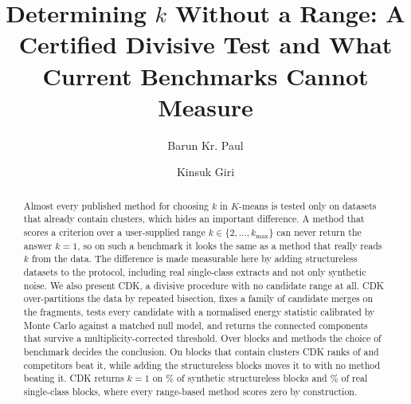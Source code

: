 \documentclass[runningheads]{llncs}
\newif\ifanon
\begin{document}
\title{Determining $k$ Without a Range: A Certified Divisive Test and What
Current Benchmarks Cannot Measure}


\ifanon
  \author{Anonymous Author(s)}
  \authorrunning{Anonymous}
  \institute{Affiliation withheld for double-blind review}
\else
  \author{Barun Kr. Paul \and Kinsuk Giri}
\fi

\maketitle

\begin{abstract}
Almost every published method for choosing $k$ in $K$-means is tested only on
datasets that already contain clusters, which hides an important difference. A
method that scores a criterion over a user-supplied range
$k \in \{2,\dots,k_{\max}\}$ can never return the answer $k=1$, so on such a
benchmark it looks the same as a method that really reads $k$ from the data.
The difference is made measurable here by adding structureless datasets to the
protocol, including real single-class extracts and not only synthetic noise.
We also present CDK, a divisive procedure with no candidate range at all. CDK
over-partitions the data by repeated bisection, fixes a family of candidate
merges on the fragments, tests every candidate with a normalised energy
statistic calibrated by Monte Carlo against a matched null model, and returns
the connected components that survive a multiplicity-corrected threshold. Over
\nNBLOCK{} blocks and \nNMETH{} methods the choice of benchmark decides the
conclusion. On blocks that contain clusters CDK ranks \nSTPOS{} of \nNMETH{}
and \nSTWORSE{} competitors beat it, while adding the structureless blocks
moves it to \nALPOS{} with no method beating it. CDK returns $k=1$ on
\nCDKNULL\% of synthetic structureless blocks and \nCDKRNULL\% of real
single-class blocks, where every range-based method scores zero by
construction.

\end{abstract}
\end{document}
